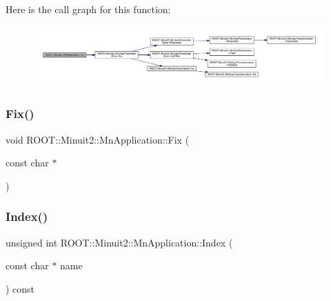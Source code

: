 Here is the call graph for this function\+:
\nopagebreak
\begin{figure}[H]
\begin{center}
\leavevmode
\includegraphics[width=350pt]{df/dd5/classROOT_1_1Minuit2_1_1MnApplication_aa678010fc292b1d0f4cb1761b13104c4_cgraph}
\end{center}
\end{figure}
\mbox{\label{classROOT_1_1Minuit2_1_1MnApplication_aa678010fc292b1d0f4cb1761b13104c4}} 
\subsubsection{\texorpdfstring{Fix()}{Fix()}\hspace{0.1cm}{\footnotesize\ttfamily [6/6]}}
{\footnotesize\ttfamily void R\+O\+O\+T\+::\+Minuit2\+::\+Mn\+Application\+::\+Fix (\begin{DoxyParamCaption}\item[{const char $\ast$}]{ }\end{DoxyParamCaption})}

\mbox{\label{classROOT_1_1Minuit2_1_1MnApplication_a6b6e2bc386692b9e3cd8a9ad01fc175e}} 
\subsubsection{\texorpdfstring{Index()}{Index()}\hspace{0.1cm}{\footnotesize\ttfamily [1/3]}}
{\footnotesize\ttfamily unsigned int R\+O\+O\+T\+::\+Minuit2\+::\+Mn\+Application\+::\+Index (\begin{DoxyParamCaption}\item[{const char $\ast$}]{name }\end{DoxyParamCaption}) const}

